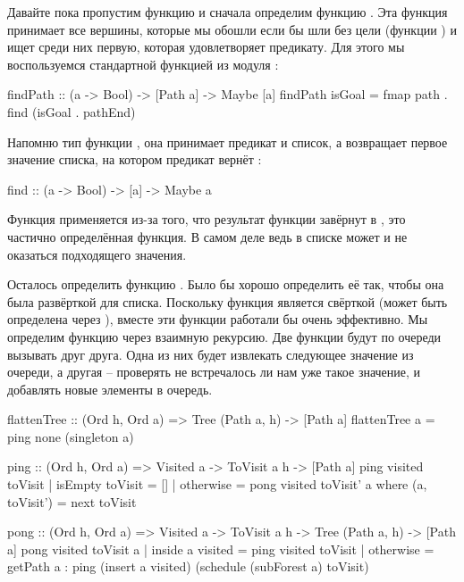Давайте пока пропустим функцию  и сначала определим
функцию . Эта функция принимает все вершины, которые мы
обошли если бы шли без цели (функции ) и ищет среди них
первую, которая удовлетворяет предикату. Для этого мы воспользуемся
стандартной функцией  из модуля :


\begin{code}
findPath :: (a -> Bool) -> [Path a] -> Maybe [a]
findPath isGoal =  fmap path . find (isGoal . pathEnd)
\end{code}

Напомню тип функции , она принимает предикат и список, а
возвращает первое значение списка, на котором предикат вернёт :


\begin{code}
find :: (a -> Bool) -> [a] -> Maybe a
\end{code}

Функция  применяется из-за того, что результат функции
 завёрнут в , это частично определённая функция. В
самом деле ведь в списке может и не оказаться подходящего значения.

Осталось определить функцию . Было бы хорошо определить
её так, чтобы она была развёрткой для списка. Поскольку функция
 является свёрткой (может быть определена через ),
вместе эти функции работали бы очень эффективно. Мы определим функцию
 через взаимную рекурсию. Две функции будут по очереди
вызывать друг друга. Одна из них будет извлекать следующее значение из
очереди, а другая -- проверять не встречалось ли нам уже такое значение,
и добавлять новые элементы в очередь.


\begin{code}
flattenTree :: (Ord h, Ord a) => Tree (Path a, h) -> [Path a]
flattenTree a = ping none (singleton a) 

ping :: (Ord h, Ord a) => Visited a -> ToVisit a h -> [Path a]
ping visited toVisit 
    | isEmpty toVisit = []
    | otherwise       = pong visited toVisit' a
    where (a, toVisit') = next toVisit


pong :: (Ord h, Ord a) 
    => Visited a -> ToVisit a h -> Tree (Path a, h) -> [Path a]
pong visited toVisit a 
    | inside a visited  = ping visited toVisit
    | otherwise         = getPath a : 
        ping (insert a visited) (schedule (subForest a) toVisit)
\end{code}

